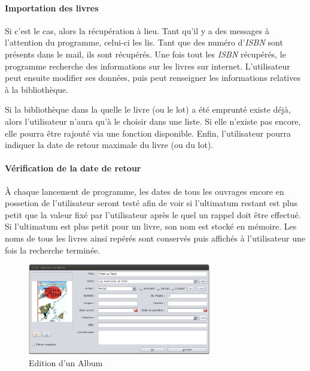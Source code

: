 \paragraph{Importation des livres}
Si c'est le cas, alors la récupération à lieu. 
Tant qu'il y a des messages à l'attention du programme, celui-ci les lis. 
Tant que des numéro d'\emph{ISBN} sont présents dans le mail, ils sont récupérés. 
Une fois tout les \emph{ISBN} récupérés, le programme recherche des informations sur les livres sur internet.
L'utilisateur peut ensuite modifier ses données, puis peut renseigner les informations relatives à la bibliothèque. 

Si la bibliothèque dans la quelle le livre (ou le lot) a été emprunté existe déjà, 
alors l'utilisateur n'aura qu'à le choisir dans une liste. Si elle n'existe pas encore, elle pourra être rajouté via une fonction disponible. 
Enfin, l'utilisateur pourra indiquer la date de retour maximale du livre (ou du lot).

\paragraph{Vérification de la date de retour}
À chaque lancement de programme, les dates de tous les ouvrages encore en possetion de l'utilisateur seront testé afin de voir si l'ultimatum restant est plus petit que la valeur fixé par l'utilisateur après le quel un rappel doit être effectué. 
Si l'ultimatum est plus petit pour un livre, son nom est stocké en mémoire. 
Les noms de tous les livres ainsi repérés sont conservés puis affichés à l'utilisateur une fois la recherche terminée. 


\begin{figure}
\includegraphics[width=8cm]{../img/editionAlbum.png}
\caption{Edition d'un Album}
\end{figure}
